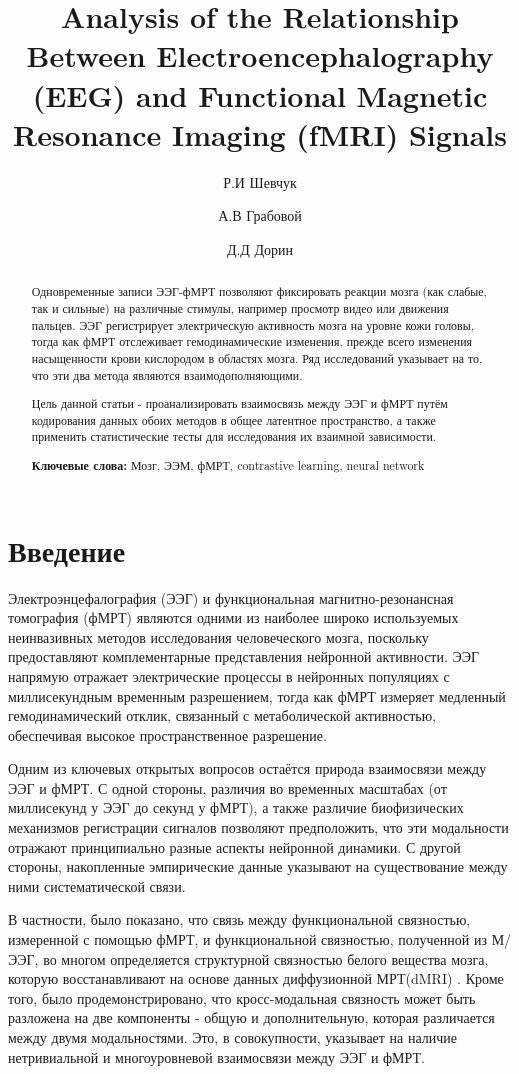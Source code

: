 \documentclass[12pt]{article}
\title{Analysis of the Relationship Between Electroencephalography (EEG) and
Functional Magnetic Resonance Imaging (fMRI) Signals}
\author[1]{Р.И Шевчук}
\author[2]{А.В Грабовой}
\author[3]{Д.Д Дорин}
\affil[1]{shevchuk.r@phystech.edu}
\affil[2]{grabovoy.av@phystech.edu}
\affil[3]{dorin.dd@phystech.edu}
\date{}
\begin{document}
\hypersetup{final}
\maketitle

\begin{abstract}
Одновременные записи ЭЭГ-фМРТ позволяют фиксировать реакции мозга (как слабые, так и сильные) на различные стимулы, например просмотр видео или движения пальцев. ЭЭГ регистрирует электрическую активность мозга на уровне кожи головы, тогда как фМРТ отслеживает гемодинамические изменения, прежде всего изменения насыщенности крови кислородом в областях мозга. Ряд исследований указывает на то, что эти два метода являются взаимодополняющими.

Цель данной статьи - проанализировать взаимосвязь между ЭЭГ и фМРТ путём кодирования данных обоих методов в общее латентное пространство, а также применить статистические тесты для исследования их взаимной зависимости.

\textbf{Ключевые слова:} Мозг, ЭЭМ, фМРТ, contrastive learning, neural network
\end{abstract}

\section{Введение}
Электроэнцефалография (ЭЭГ) и функциональная магнитно-резонансная томография (фМРТ) являются одними из наиболее широко используемых неинвазивных методов исследования человеческого мозга, поскольку предоставляют комплементарные представления нейронной активности. ЭЭГ напрямую отражает электрические процессы в нейронных популяциях с миллисекундным временным разрешением, тогда как фМРТ измеряет медленный гемодинамический отклик, связанный с метаболической активностью, обеспечивая высокое пространственное разрешение.

Одним из ключевых открытых вопросов остаётся природа взаимосвязи между ЭЭГ и фМРТ. С одной стороны, различия во временных масштабах (от миллисекунд у ЭЭГ до секунд у фМРТ), а также различие биофизических механизмов регистрации сигналов позволяют предположить, что эти модальности отражают принципиально разные аспекты нейронной динамики. С другой стороны, накопленные эмпирические данные указывают на существование между ними систематической связи.

В частности, было показано, что связь между функциональной связностью, измеренной с помощью фМРТ, и функциональной связностью, полученной из М/ЭЭГ, во многом определяется структурной связностью белого вещества мозга, которую восстанавливают на основе данных диффузионной МРТ(dMRI) \cite{Sadaghiani2020}. Кроме того, было продемонстрировано, что кросс-модальная связность может быть разложена на две компоненты - общую и дополнительную, которая различается между двумя модальностями\cite{Wirsich2021}. Это, в совокупности, указывает на наличие нетривиальной и многоуровневой взаимосвязи между ЭЭГ и фМРТ.
\end{document}
